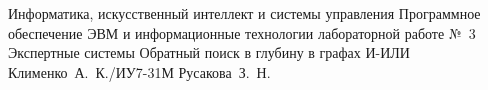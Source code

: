 \documentclass{bmstu}
\begin{document}
\makereporttitle
    {Информатика, искусственный интеллект и системы управления} %
    {Программное обеспечение ЭВМ и информационные технологии} %
    {лабораторной работе №~3} %
    {Экспертные системы} %
    {Обратный поиск в глубину в графах И-ИЛИ} %
    {} %
    {Клименко~А.~К./ИУ7-31М} %
    {Русакова~З.~Н.} %





\end{document}
